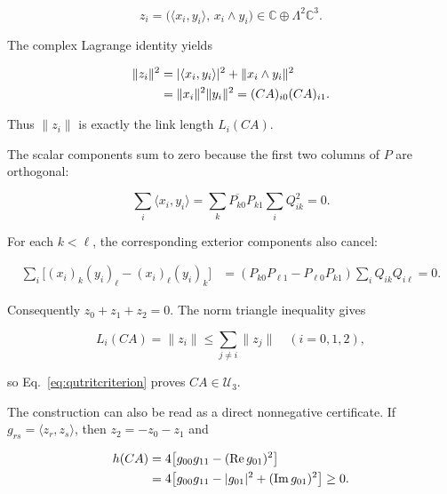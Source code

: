 \documentclass[aip,jmp,amsmath,amssymb,preprint,nofootinbib]{revtex4-2}
\newcommand{\Ud}{\mathcal{U}_3}
\begin{document}
\begin{equation}
 z_i=\bigl(\langle x_i,y_i\rangle,\,x_i\wedge y_i\bigr)
 \in \mathbb C\oplus\Lambda^2\mathbb C^3.
 \label{eq:zdef}
\end{equation}

The complex Lagrange identity yields

\begin{align}
 \|z_i\|^2
 &=|\langle x_i,y_i\rangle|^2+\|x_i\wedge y_i\|^2\notag\\
 &=\|x_i\|^2\|y_i\|^2
 =(CA)_{i0}(CA)_{i1}.                              \label{eq:lagrange}
\end{align}

Thus $\|z_i\|$ is exactly the link length $L_i(CA)$.

The scalar components sum to zero because the first two columns of $P$ are
orthogonal:

\begin{equation}
 \sum_i\langle x_i,y_i\rangle
 =\sum_k\overline{P_{k0}}P_{k1}\sum_iQ_{ik}^2=0.
 \label{eq:scalarcancel}
\end{equation}

For each $k<\ell$, the corresponding exterior components also cancel:

\begin{align}
 \sum_i\bigl[(x_i)_k(y_i)_\ell-(x_i)_\ell(y_i)_k\bigr]
 &=(P_{k0}P_{\ell1}-P_{\ell0}P_{k1})
   \sum_iQ_{ik}Q_{i\ell}=0.                       \label{eq:wedgecancel}
\end{align}

Consequently $z_0+z_1+z_2=0$.  The norm triangle inequality gives

\begin{equation}
 L_i(CA)=\|z_i\|\leq\sum_{j\ne i}\|z_j\|
 \quad(i=0,1,2),                                  \label{eq:normtriangle}
\end{equation}

so Eq.~\eqref{eq:qutritcriterion} proves $CA\in\Ud$.

The construction can also be read as a direct nonnegative certificate.  If
$g_{rs}=\langle z_r,z_s\rangle$, then $z_2=-z_0-z_1$ and

\begin{align}
 h(CA)
 &=4\bigl[g_{00}g_{11}-(\operatorname{Re}g_{01})^2\bigr]\notag\\
 &=4\bigl[g_{00}g_{11}-|g_{01}|^2
          +(\operatorname{Im}g_{01})^2\bigr]\geq0. \label{eq:gramcert}
\end{align}
\end{document}

